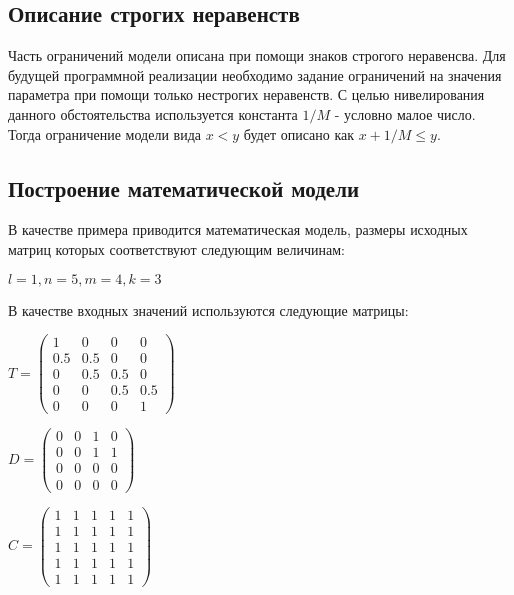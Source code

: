 \subsection*{Описание строгих неравенств}
Часть ограничений модели описана при помощи знаков строгого неравенсва. Для будущей программной реализации необходимо задание ограничений на значения параметра при помощи только нестрогих неравенств. С целью нивелирования данного обстоятельства используется константа $1 / M$ - условно малое число. Тогда ограничение модели вида $x < y$ будет описано как $x + 1 / M \le y$.

\subsection*{Построение математической модели}
В качестве примера приводится математическая модель, размеры исходных матриц которых соответствуют следующим величинам:
\begin{center}
  $l = 1, n = 5, m = 4, k = 3$
\end{center}

В качестве входных значений используются следующие матрицы:
\begin{center}
  $
  T = 
  \begin{pmatrix}
      1 &   0 &   0 & 0   \\
    0.5 & 0.5 &   0 & 0   \\
      0 & 0.5 & 0.5 & 0   \\
      0 &   0 & 0.5 & 0.5 \\
      0 &   0 &   0 & 1 
  \end{pmatrix}
  $
\end{center}

\begin{center}
  $
  D = 
  \begin{pmatrix}
    0 & 0 & 1 & 0   \\
    0 & 0 & 1 & 1   \\
    0 & 0 & 0 & 0   \\
    0 & 0 & 0 & 0 
  \end{pmatrix}
  $
\end{center}

\begin{center}
  $
  C = 
  \begin{pmatrix}
    1 & 1 & 1 & 1 & 1   \\
    1 & 1 & 1 & 1 & 1   \\
    1 & 1 & 1 & 1 & 1   \\
    1 & 1 & 1 & 1 & 1   \\
    1 & 1 & 1 & 1 & 1 
  \end{pmatrix}
  $
\end{center}


